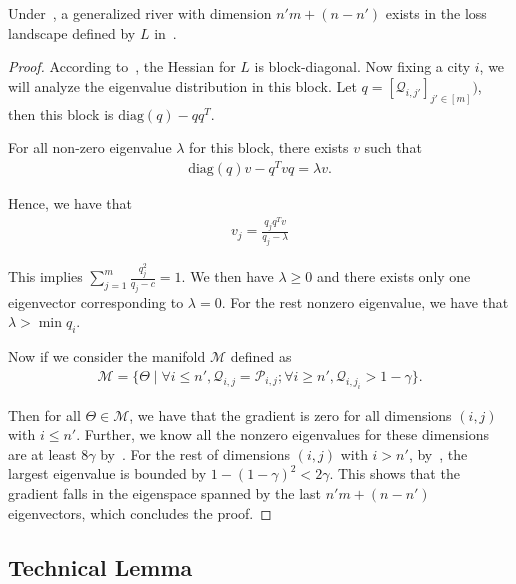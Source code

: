 \begin{theorem}
\label{thm:toy}
Under~, a generalized river with dimension $n'm + (n - n')$ exists in the loss landscape defined by $L$ in~. 
\end{theorem}

\begin{proof}
    According to~, the Hessian for $L$ is block-diagonal. Now fixing a city $i$, we will analyze the eigenvalue distribution in this block. Let $q = [\mathcal{Q}_{i,j'}]_{j' \in [m]})$, then this block is $\mathrm{diag}(q) - qq^T$. 
    
    For all non-zero eigenvalue $\lambda$ for this block, there exists $v$ such that
    \begin{align*}
        \mathrm{diag}(q) v - q^T v q = \lambda v.
    \end{align*}

    Hence, we have that
    \begin{align*}
        v_j = \frac{q_j q^T v}{q_j - \lambda}
    \end{align*}

    This implies $\sum_{j = 1}^m \frac{q_j^2}{q_j - c} = 1$. We then have $\lambda \ge 0$ and there exists only one eigenvector corresponding to  $\lambda = 0$. For the rest nonzero eigenvalue, we have that $\lambda > \min q_i$.

    Now if we consider the manifold $\mathcal{M}$ defined as 
    \begin{align*}
        \mathcal{M} = \{ \Theta \mid \forall i \le n', \mathcal{Q}_{i,j} = \mathcal{P}_{i,j}; \forall i \ge n', \mathcal{Q}_{i,j_i} > 1 -  \gamma\}.
    \end{align*}

    Then for all $\Theta \in \mathcal{M}$, we have that the gradient is zero for all dimensions $(i, j)$ with $i \le n'$. Further, we know all the nonzero eigenvalues for these dimensions are at least $8 \gamma$ by~. For the rest of dimensions $(i, j)$ with $i > n'$, by~, the largest eigenvalue is bounded by $1 - (1 - \gamma)^2 < 2 \gamma$. This shows that the gradient falls in the eigenspace spanned by the last $n'm + (n - n')$ eigenvectors, which concludes the proof.
\end{proof} 


\subsection{Technical Lemma}



